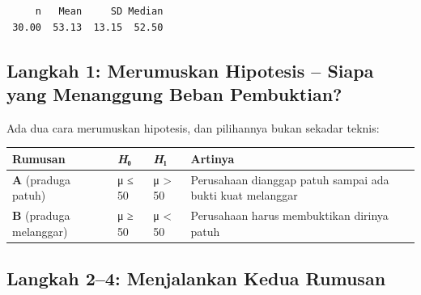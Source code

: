 \documentclass[
  indonesian,
  letterpaper,
]{book}
\newcounter{none} %
\begin{document}
\begin{verbatim}
     n   Mean     SD Median 
 30.00  53.13  13.15  52.50 
\end{verbatim}

\subsection{Langkah 1: Merumuskan Hipotesis -- Siapa yang Menanggung
Beban
Pembuktian?}\label{langkah-1-merumuskan-hipotesis-siapa-yang-menanggung-beban-pembuktian}

Ada dua cara merumuskan hipotesis, dan pilihannya bukan sekadar teknis:

{\def\LTcaptype{none} %
\begin{longtable}[]{@{}
  >{\raggedright\arraybackslash}p{}
  >{\raggedright\arraybackslash}p{}
  >{\raggedright\arraybackslash}p{}
  >{\raggedright\arraybackslash}p{}@{}}
\toprule\noalign{}
\begin{minipage}[b]{\linewidth}\raggedright
Rumusan
\end{minipage} & \begin{minipage}[b]{\linewidth}\raggedright
\emph{H}₀
\end{minipage} & \begin{minipage}[b]{\linewidth}\raggedright
\emph{H}₁
\end{minipage} & \begin{minipage}[b]{\linewidth}\raggedright
Artinya
\end{minipage} \\
\midrule\noalign{}
\endhead
\bottomrule\noalign{}
\endlastfoot
\textbf{A} (praduga patuh) & μ ≤ 50 & μ \textgreater{} 50 & Perusahaan
dianggap patuh sampai ada bukti kuat melanggar \\
\textbf{B} (praduga melanggar) & μ ≥ 50 & μ \textless{} 50 & Perusahaan
harus membuktikan dirinya patuh \\
\end{longtable}
}

\subsection{Langkah 2--4: Menjalankan Kedua
Rumusan}\label{langkah-24-menjalankan-kedua-rumusan}
\end{document}
